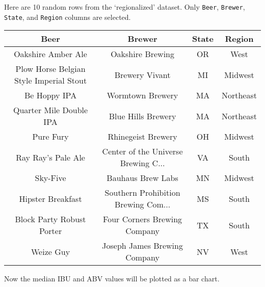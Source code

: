 \documentclass[]{article}
\newenvironment{Shaded}{\begin{snugshade}}{\end{snugshade}}
\newcommand{\DataTypeTok}[1]{\textcolor[rgb]{0.13,0.29,0.53}{#1}}
\newcommand{\DecValTok}[1]{\textcolor[rgb]{0.00,0.00,0.81}{#1}}
\newcommand{\KeywordTok}[1]{\textcolor[rgb]{0.13,0.29,0.53}{\textbf{#1}}}
\newcommand{\NormalTok}[1]{#1}
\newcommand{\OperatorTok}[1]{\textcolor[rgb]{0.81,0.36,0.00}{\textbf{#1}}}
\newcommand{\StringTok}[1]{\textcolor[rgb]{0.31,0.60,0.02}{#1}}
\begin{document}
Here are 10 random rows from the `regionalized' dataset. Only
\texttt{Beer}, \texttt{Brewer}, \texttt{State}, and \texttt{Region}
columns are selected.

\begin{Shaded}
\end{Shaded}

\begin{table}[H]
\centering
\begin{tabular}{c|c|c|c}
\hline
Beer & Brewer & State & Region\\
\hline
Oakshire Amber Ale & Oakshire Brewing & OR & West\\
\hline
Plow Horse Belgian Style Imperial Stout & Brewery Vivant & MI & Midwest\\
\hline
Be Hoppy IPA & Wormtown Brewery & MA & Northeast\\
\hline
Quarter Mile Double IPA & Blue Hills Brewery & MA & Northeast\\
\hline
Pure Fury & Rhinegeist Brewery & OH & Midwest\\
\hline
Ray Ray’s Pale Ale & Center of the Universe Brewing C... & VA & South\\
\hline
Sky-Five & Bauhaus Brew Labs & MN & Midwest\\
\hline
Hipster Breakfast & Southern Prohibition Brewing Com... & MS & South\\
\hline
Block Party Robust Porter & Four Corners Brewing Company & TX & South\\
\hline
Weize Guy & Joseph James Brewing Company & NV & West\\
\hline
\end{tabular}
\end{table}

Now the median IBU and ABV values will be plotted as a bar chart.
\end{document}
